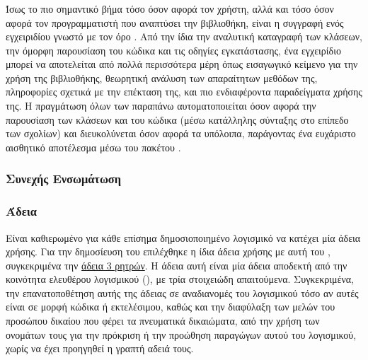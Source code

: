 \subsubsection{}
Ίσως το πιο σημαντικό βήμα τόσο όσον αφορά τον χρήστη, αλλά και τόσο όσον αφορά τον προγραμματιστή που αναπτύσει την βιβλιοθήκη, είναι η συγγραφή ενός εγχειριδίου γνωστό με τον όρο \textit{}.
Από την ίδια την αναλυτική καταγραφή των κλάσεων, την όμορφη παρουσίαση του κώδικα και τις οδηγίες εγκατάστασης, ένα εγχειρίδιο μπορεί να αποτελείται από πολλά περισσότερα μέρη όπως εισαγωγικό κείμενο για την χρήση της βιβλιοθήκης, θεωρητική ανάλυση των απαραίτητων μεθόδων της, πληροφορίες σχετικά με την επέκταση της, και πιο ενδιαφέροντα παραδείγματα χρήσης της.
Η πραγμάτωση όλων των παραπάνω αυτοματοποιείται όσον αφορά την παρουσίαση των κλάσεων και του κώδικα (μέσω κατάλληλης σύνταξης στο επίπεδο των σχολίων) και διευκολύνεται όσον αφορά τα υπόλοιπα, παράγοντας ένα ευχάριστο αισθητικό αποτέλεσμα μέσω του πακέτου \href{https://pypi.org/project/Sphinx/}{}.
\subsubsection{Συνεχής Ενσωμάτωση}

\subsubsection{Άδεια}
Είναι καθιερωμένο για κάθε επίσημα δημοσιοποιημένο λογισμικό να κατέχει μία άδεια χρήσης.
Για την δημοσίευση του  επιλέχθηκε η ίδια άδεια χρήσης με αυτή του \href{https://en.wikipedia.org/wiki/Scikit-learn}{}, συγκεκριμένα την \href{https://en.wikipedia.org/wiki/BSD_licenses#3-clause_license_(%22BSD_License_2.0%22,_%22Revised_BSD_License%22,_%22New_BSD_License%22,_or_%22Modified_BSD_License%22)}{άδεια \en{BSD} 3 ρητρών}.
Η άδεια αυτή είναι μία άδεια αποδεκτή από την κοινότητα ελευθέρου λογισμικού (), με τρία στοιχειώδη απαιτούμενα.
Συγκεκριμένα, την επανατοποθέτηση αυτής της άδειας σε αναδιανομές του λογισμικού τόσο αν αυτές είναι σε μορφή κώδικα ή εκτελέσιμου, καθώς και την διαφύλαξη των μελών του προσώπου δικαίου που φέρει τα πνευματικά δικαιώματα, από την χρήση των ονομάτων τους για την πρόκριση ή την προώθηση παραγώγων αυτού του λογισμικού, χωρίς να έχει προηγηθεί η γραπτή αδειά τους.
